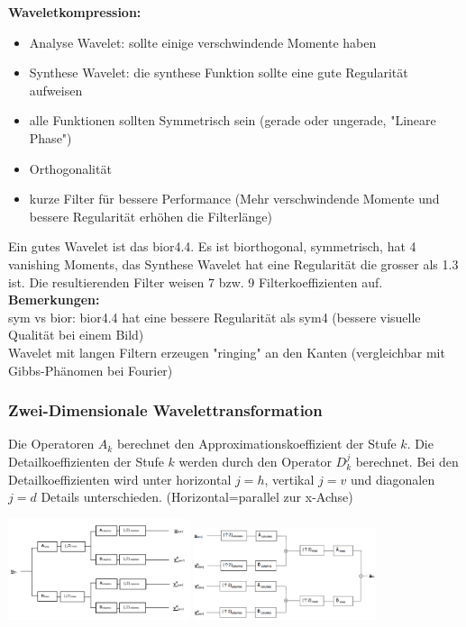 \textbf{Waveletkompression:}
\begin{itemize}
	\item Analyse Wavelet: sollte einige verschwindende Momente haben
	\item Synthese Wavelet: die synthese Funktion sollte eine gute Regularität aufweisen
	\item alle Funktionen sollten Symmetrisch sein (gerade oder ungerade, "Lineare Phase")
	\item Orthogonalität
	\item kurze Filter für bessere Performance (Mehr verschwindende Momente und bessere Regularität erhöhen die Filterlänge)
\end{itemize}
Ein gutes Wavelet ist das bior4.4. Es ist biorthogonal, symmetrisch, hat 4 vanishing Moments, das Synthese Wavelet hat eine Regularität die grosser als 1.3 ist. Die resultierenden Filter weisen 7 bzw. 9 Filterkoeffizienten auf.\\

\textbf{Bemerkungen:}\\
sym vs bior: bior4.4 hat eine bessere Regularität als sym4 (bessere visuelle Qualität bei einem Bild)\\
Wavelet mit langen Filtern erzeugen "ringing" an den Kanten (vergleichbar mit Gibbs-Phänomen bei Fourier)\\


\subsubsection{Zwei-Dimensionale Wavelettransformation}

Die Operatoren $A_k$ berechnet den Approximationskoeffizient der Stufe $k$. Die Detailkoeffizienten der Stufe $k$ werden durch den Operator $D_k^j$ berechnet. Bei den Detailkoeffizienten wird unter horizontal $j=h$, vertikal $j=v$ und diagonalen $j=d$ Details unterschieden. (Horizontal=parallel zur x-Achse)

\includegraphics[width=0.4\textwidth]{content/Wavelet2DDec.pdf}	
\includegraphics[width=0.4\textwidth]{content/Wavelet2DRec.pdf}

